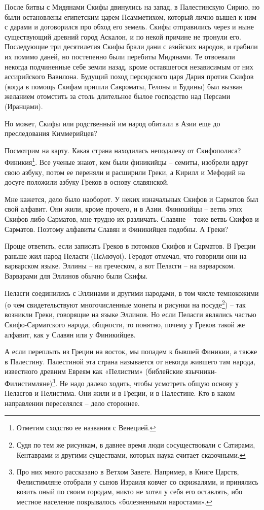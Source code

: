 После битвы с Мидянами Скифы двинулись на запад, в Палестинскую Сирию, но были остановлены египетским царем Псамметихом, который лично вышел к ним с дарами и договорился про обход его земель. Скифы отправились через и ныне существующий древний город Аскалон, и по некой причине не тронули его. Последующие три десятилетия Скифы брали дани с азийских народов, и грабили их помимо даней, но постепенно были перебиты Мидянами. Те отвоевали некогда подчиненные себе земли назад, кроме оставшегося независимым от них ассирийского Вавилона. Будущий поход персидского царя Дария против Скифов (когда в помощь Скифам пришли Савроматы, Гелоны и Будины) был вызван желанием отомстить за столь длительное былое господство над Персами (Иранцами).

Но может, Скифы или родственный им народ обитали в Азии еще до преследования Киммерийцев?

Посмотрим на карту. Какая страна находилась неподалеку от Скифополиса? Финикия\footnote{Отметим сходство ее названия с Венецией.}. Все ученые знают, кем были финикийцы – семиты, изобрели вдруг свою азбуку, потом ее переняли и расширили Греки, а Кирилл и Мефодий на досуге положили азбуку Греков в основу славянской.

Мне кажется, дело было наоборот. У неких изначальных Скифов и Сарматов был свой алфавит. Они жили, кроме прочего, и в Азии. Финикийцы – ветвь этих Скифов либо Сарматов, мне трудно их различать. Славяне – тоже ветвь Скифов и Сарматов. Поэтому алфавиты Славян и Финикийцев подобны. А Греки?

Проще ответить, если записать Греков в потомков Скифов и Сарматов. В Греции раньше жил народ Пеласги (Πελασγοί). Геродот отмечал, что говорили они на варварском языке. Эллины – на греческом, а вот Пеласги – на варварском. Варварами для Эллинов обычно были Скифы.

Пеласги соединились с Эллинами и другими народами, в том числе темнокожими (о чем свидетельствуют многочисленные монеты и рисунки на посуде\footnote{Судя по тем же рисункам, в давнее время люди сосуществовали с Сатирами, Кентаврами и другими существами, которых наука считает сказочными.}) – так возникли Греки, говорящие на языке Эллинов. Но если Пеласги являлись частью Скифо-Сарматского народа, общности, то понятно, почему у Греков такой же алфавит, как у Славян или у Финикийцев.

А если переплыть из Греции на восток, мы попадем к бывшей Финикии, а также в Палестину. Палестиной эта страна называется от некогда жившего там народа, известного древним Евреям как «Пелистим» (библейские язычники-Филистимляне)\footnote{Про них много рассказано в Ветхом Завете. Например, в Книге Царств, Фелистимляне отобрали у сынов Израиля ковчег со скрижалями, и принялись возить оный по своим городам, никто не хотел у себя его оставлять, ибо местное население покрывалось «болезненными наростами».}. Не надо далеко ходить, чтобы усмотреть общую основу у Пеласгов и Пелистима. Они жили и в Греции, и в Палестине. Кто в каком направлении переселялся – дело стороннее.

